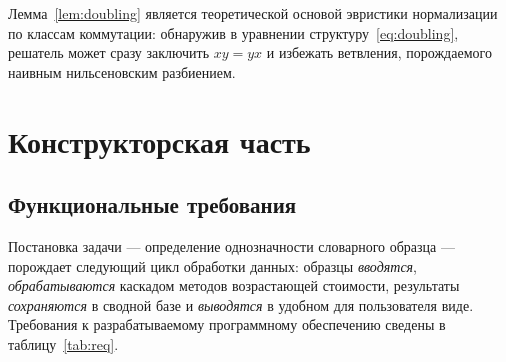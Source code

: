 \documentclass[14pt, russian]{scrartcl}
\begin{document}
Лемма~\ref{lem:doubling} является теоретической основой эвристики нормализации по
классам коммутации: обнаружив в уравнении структуру~\eqref{eq:doubling}, решатель
может сразу заключить $x y = y x$ и избежать ветвления, порождаемого наивным
нильсеновским разбиением.


\section{Конструкторская часть}
\subsection{Функциональные требования}
\label{sec:req}

Постановка задачи --- определение однозначности словарного образца --- порождает
следующий цикл обработки данных: образцы \textit{вводятся}, \textit{обрабатываются}
каскадом методов возрастающей стоимости, результаты \textit{сохраняются} в сводной базе
и \textit{выводятся} в удобном для пользователя виде. Требования к разрабатываемому
программному обеспечению сведены в таблицу~\ref{tab:req}.
\end{document}
